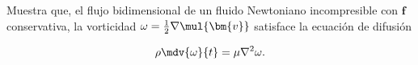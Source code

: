 \documentclass[../main.tex]{subfiles}
\begin{document}
\begin{problema}
	Muestra que, el flujo bidimensional de un fluido Newtoniano incompresible
	con \(\bm{f}\) conservativa, la vorticidad
	\(\omega = \tfrac{1}{2} \nabla \mul{\bm{v}}\)
	satisface la ecuación de difusión

	\begin{equation*}
		\rho \mdv{\omega}{t} = \mu \nabla^{2}{\omega}.
	\end{equation*}
\end{problema}
\end{document}
